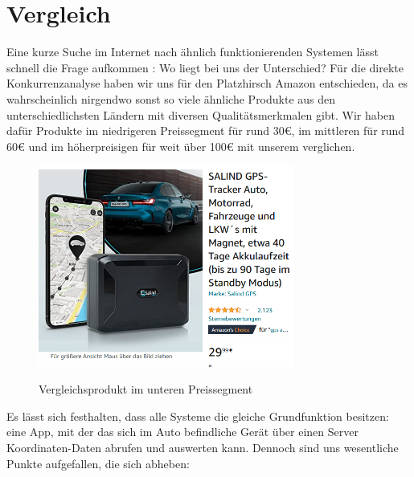 \section{Vergleich} 
Eine kurze Suche im Internet nach ähnlich funktionierenden  Systemen lässt schnell die Frage aufkommen : 
Wo liegt bei uns der Unterschied?
Für die direkte Konkurrenzanalyse haben wir uns für den Platzhirsch Amazon entschieden, da es wahrscheinlich nirgendwo sonst so viele ähnliche Produkte aus den unterschiedlichsten Ländern mit diversen Qualitätsmerkmalen gibt. Wir haben dafür Produkte im niedrigeren  Preissegment für rund 30€, im mittleren für rund 60€ und im höherpreisigen für weit über 100€ mit unserem verglichen. 
\begin{figure} [H]
	\begin{center}
		\includegraphics[width=0.75\textwidth]{Bilder/Produkt_Vergleich.png}
		\caption{Vergleichsprodukt im unteren Preissegment}
		\cite{Salind}
		\label{product_vgl}
	\end{center}
\end{figure}
Es lässt sich festhalten, dass alle Systeme die gleiche Grundfunktion besitzen: eine App, mit der das sich im Auto befindliche Gerät über einen Server Koordinaten-Daten abrufen und auswerten kann. Dennoch sind uns wesentliche Punkte aufgefallen, die sich abheben:

